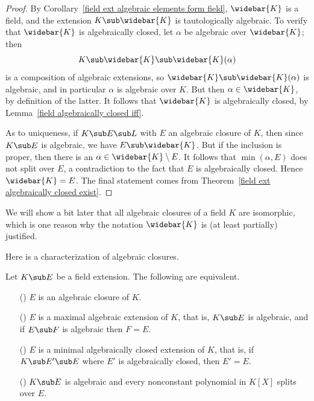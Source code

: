 \begin{proof}
By Corollary~\ref{field ext algebraic elements form field}, $\widebar{K}$ is a field, and the extension $K\sub\widebar{K}$ is tautologically algebraic. To verify that $\widebar{K}$ is algebraically closed, let $\alpha$ be algebraic over $\widebar{K}$; then
\[K\sub\widebar{K}\sub\widebar{K}(\alpha)\]
is a composition of algebraic extensions, so $\widebar{K}\sub\widebar{K}(\alpha)$ is algebraic, and in particular $\alpha$ is algebraic over $K$. But then $\alpha\in\widebar{K}$, by definition of the latter. It follows that $\widebar{K}$ is algebraically closed, by Lemma~\ref{field algebraically closed iff}.\par
As to uniqueness, if $K\sub E\sub L$ with $E$ an algebraic closure of $K$, then since $K\sub E$ is algebraic, we have $E\sub\widebar{K}$. But if the inclusion is proper, then there is an $\alpha\in\widebar{K}\setminus E$. It follows that $\min(\alpha,E)$ does not split over $E$, a contradiction to the fact that $E$ is algebraically closed. Hence $\widebar{K}=E$. The final statement comes from Theorem~\ref{field ext algebraically closed exist}.
\end{proof}
We will show a bit later that all algebraic closures of a field $K$ are isomorphic, which is one reason why the notation $\widebar{K}$ is (at least partially) justified.\par
Here is a characterization of algebraic closures.
\begin{proposition}\label{field algebraic closure char}
Let $K\sub E$ be a field extension. The following are equivalent.
\begin{itemize}
\item[(\rmnum{1})] $E$ is an algebraic closure of $K$.
\item[(\rmnum{2})] $E$ is a maximal algebraic extension of $K$, that is, $K\sub E$ is algebraic, and if $E\sub F$ is algebraic then $F=E$.
\item[(\rmnum{3})] $E$ is a minimal algebraically closed extension of $K$, that is, if $K\sub E'\sub E$ where $E'$ is algebraically closed, then $E'=E$.
\item[(\rmnum{4})] $K\sub E$ is algebraic and every nonconstant polynomial in $K[X]$ splits over $E$.
\end{itemize}
\end{proposition}
